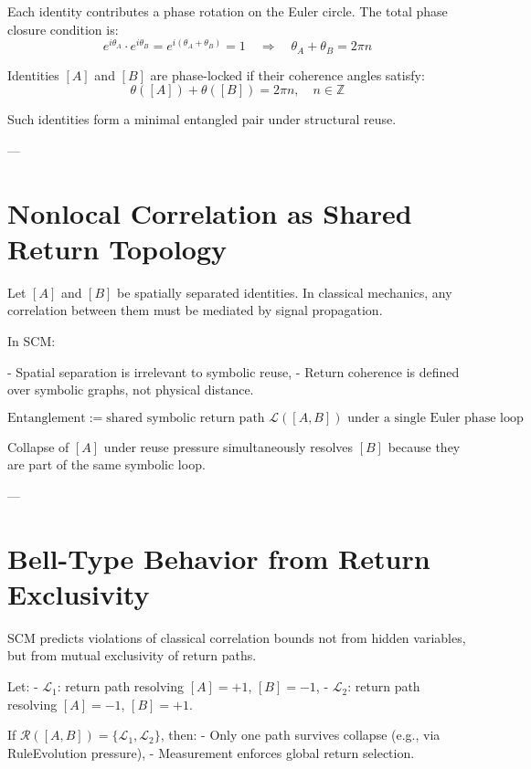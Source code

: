 Each identity contributes a phase rotation on the Euler circle. The total phase closure condition is:
\[
e^{i\theta_A} \cdot e^{i\theta_B} = e^{i(\theta_A + \theta_B)} = 1
\quad \Rightarrow \quad \theta_A + \theta_B = 2\pi n
\]

\begin{definition}
Identities $[A]$ and $[B]$ are phase-locked if their coherence angles satisfy:
\[
\theta([A]) + \theta([B]) = 2\pi n,\quad n \in \mathbb{Z}
\]
\end{definition}

Such identities form a minimal entangled pair under structural reuse.

---

\section{Nonlocal Correlation as Shared Return Topology}

Let $[A]$ and $[B]$ be spatially separated identities. In classical mechanics, any correlation between them must be mediated by signal propagation.

In SCM:

- Spatial separation is irrelevant to symbolic reuse,
- Return coherence is defined over symbolic graphs, not physical distance.

\[
\text{Entanglement} := \text{shared symbolic return path } \mathcal{L}([A,B]) \text{ under a single Euler phase loop}
\]

Collapse of $[A]$ under reuse pressure simultaneously resolves $[B]$ because they are part of the same symbolic loop.

---

\section{Bell-Type Behavior from Return Exclusivity}

SCM predicts violations of classical correlation bounds not from hidden variables, but from mutual exclusivity of return paths.

Let:
- $\mathcal{L}_1$: return path resolving $[A] = +1$, $[B] = -1$,
- $\mathcal{L}_2$: return path resolving $[A] = -1$, $[B] = +1$.

If $\mathcal{R}([A,B]) = \{\mathcal{L}_1, \mathcal{L}_2\}$, then:
- Only one path survives collapse (e.g., via RuleEvolution pressure),
- Measurement enforces global return selection.

